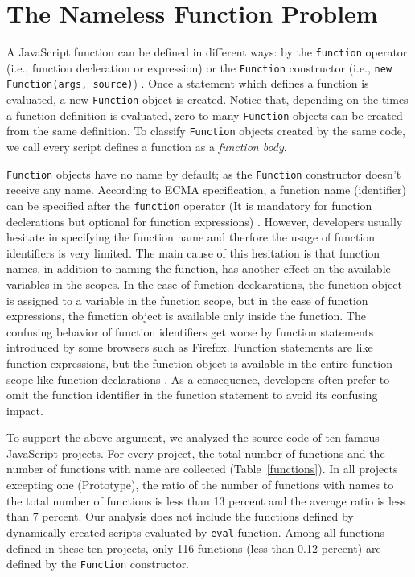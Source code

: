 \documentclass[10pt, preprint]{sigplanconf}
\begin{document}
\section{The Nameless Function Problem}

A JavaScript function can be defined in different ways: by the {\small\texttt{function}} operator (i.e., function decleration or expression) or the {\small\texttt{Function}} constructor (i.e., {\small\texttt{new Function(args, source)}}) \cite{ECMA}. Once a statement which defines a function is evaluated, a new {\small\texttt{Function}} object is created. Notice that, depending on the times a function definition is evaluated, zero to many {\small\texttt{Function}} objects can be created from the same definition. To classify {\small\texttt{Function}} objects created by the same code, we call every script defines a function as a \textit{function body}. 

{\small\texttt{Function}} objects have no name by default; as the {\small\texttt{Function}} constructor doesn't receive any name. According to ECMA specification, a function name (identifier) can be specified after the {\small\texttt{function}} operator (It is mandatory for function declerations but optional for function expressions) \cite{ECMA}. However, developers usually hesitate in specifying the function name and therfore the usage of function identifiers is very limited. The main cause of this hesitation is that function names, in addition to naming the function, has another effect on the available variables in the scopes. In the case of function declearations, the function object is assigned to a variable in the function scope, but in the case of function expressions, the function object is available only inside the function. The confusing behavior of function identifiers get worse by function statements introduced by some browsers such as Firefox. Function statements are like function expressions, but the function object is available in the entire function scope like function declarations \cite{Zaytsev}. As a consequence, developers often prefer to omit the function identifier in the function statement to avoid its confusing impact.

To support the above argument, we analyzed the source code of ten famous JavaScript projects. For every project, the total number of functions and the number of functions with name are collected (Table~\ref{functions}). In all projects excepting one (Prototype), the ratio of the number of functions with names to the total number of functions is less than 13 percent and the average ratio is less than 7 percent. Our analysis does not include the functions defined by dynamically created scripts evaluated by {\small\texttt{eval}} function. Among all functions defined in these ten projects, only 116 functions (less than 0.12 percent) are defined by the {\small\texttt{Function}} constructor. 
\end{document}
